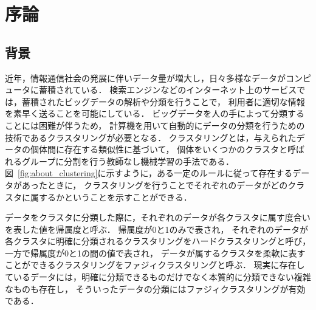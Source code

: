 \documentclass[a4j,12pt,dvipdfmx,oneside]{jsbook}
\theoremstyle{definition}
\begin{document}
\pagestyle{headings}
\def\thepage{\roman{page}}

\tableofcontents
\listoffigures
\listoftables
\newpage
\pagestyle{myheadings}

\chapter{序論}
\def\thepage{\arabic{page}}
\setcounter{page}{1}
\label{chap:first}

 \section{背景}\label{sec:background}
 
 近年，情報通信社会の発展に伴いデータ量が増大し，日々多様なデータがコンピュータに蓄積されている．
 検索エンジンなどのインターネット上のサービスでは，蓄積されたビッグデータの解析や分類を行うことで，
 利用者に適切な情報を素早く送ることを可能にしている．
 ビッグデータを人の手によって分類することには困難が伴うため，
 計算機を用いて自動的にデータの分類を行うための技術であるクラスタリングが必要となる．
 クラスタリングとは，与えられたデータの個体間に存在する類似性に基づいて，
 個体をいくつかのクラスタと呼ばれるグループに分割を行う教師なし機械学習の手法である．
 図~\ref{fig:about_clustering}に示すように，ある一定のルールに従って存在するデータがあったときに，
 クラスタリングを行うことでそれぞれのデータがどのクラスタに属するかということを示すことができる．
 
 データをクラスタに分類した際に，それぞれのデータが各クラスタに属す度合いを表した値を帰属度と呼ぶ．
 帰属度が0と1のみで表され，
 それぞれのデータが各クラスタに明確に分類されるクラスタリングをハードクラスタリングと呼び，
 一方で帰属度が0と1の間の値で表され，
 データが属するクラスタを柔軟に表すことができるクラスタリングをファジィクラスタリングと呼ぶ．
 現実に存在しているデータには，明確に分類できるものだけでなく本質的に分類できない複雑なものも存在し，
 そういったデータの分類にはファジィクラスタリングが有効である．
\end{document}
